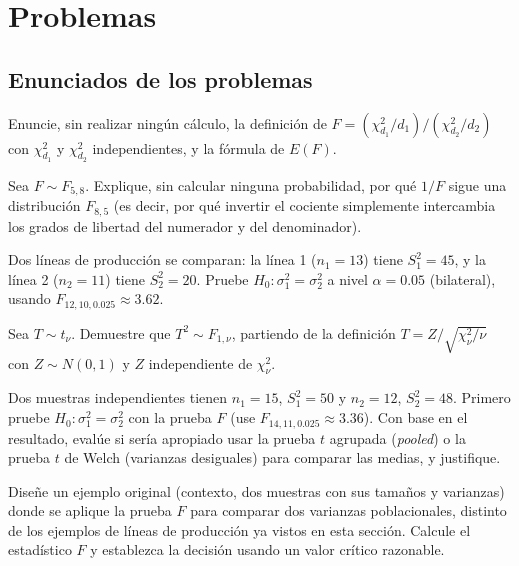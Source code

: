 \section*{Problemas}

\subsection*{Enunciados de los problemas}

\begin{problema}
	\label{prob:20ee012}
	Enuncie, sin realizar ningún cálculo, la definición de $F=(\chi^2_{d_1}/d_1)/(\chi^2_{d_2}/d_2)$ con $\chi^2_{d_1}$ y $\chi^2_{d_2}$ independientes, y la fórmula de $E(F)$.
\end{problema}

\begin{problema}
	\label{prob:2e8078c}
	Sea $F \sim F_{5,8}$. Explique, sin calcular ninguna probabilidad, por qué $1/F$ sigue una distribución $F_{8,5}$ (es decir, por qué invertir el cociente simplemente intercambia los grados de libertad del numerador y del denominador).
\end{problema}

\begin{problema}
	\label{prob:b47df2a}
	Dos líneas de producción se comparan: la línea 1 ($n_1=13$) tiene $S_1^2=45$, y la línea 2 ($n_2=11$) tiene $S_2^2=20$. Pruebe $H_0:\sigma_1^2=\sigma_2^2$ a nivel $\alpha=0.05$ (bilateral), usando $F_{12,10,0.025}\approx3.62$.
\end{problema}

\begin{problema}
	\label{prob:23d903e}
	Sea $T \sim t_\nu$. Demuestre que $T^2 \sim F_{1,\nu}$, partiendo de la definición $T=Z/\sqrt{\chi^2_\nu/\nu}$ con $Z\sim N(0,1)$ y $Z$ independiente de $\chi^2_\nu$.
\end{problema}

\begin{problema}
	\label{prob:e04a795}
	Dos muestras independientes tienen $n_1=15$, $S_1^2=50$ y $n_2=12$, $S_2^2=48$. Primero pruebe $H_0:\sigma_1^2=\sigma_2^2$ con la prueba $F$ (use $F_{14,11,0.025}\approx3.36$). Con base en el resultado, evalúe si sería apropiado usar la prueba $t$ agrupada (\emph{pooled}) o la prueba $t$ de Welch (varianzas desiguales) para comparar las medias, y justifique.
\end{problema}

\begin{problema}
	\label{prob:6277cc2}
	Diseñe un ejemplo original (contexto, dos muestras con sus tamaños y varianzas) donde se aplique la prueba $F$ para comparar dos varianzas poblacionales, distinto de los ejemplos de líneas de producción ya vistos en esta sección. Calcule el estadístico $F$ y establezca la decisión usando un valor crítico razonable.
\end{problema}

